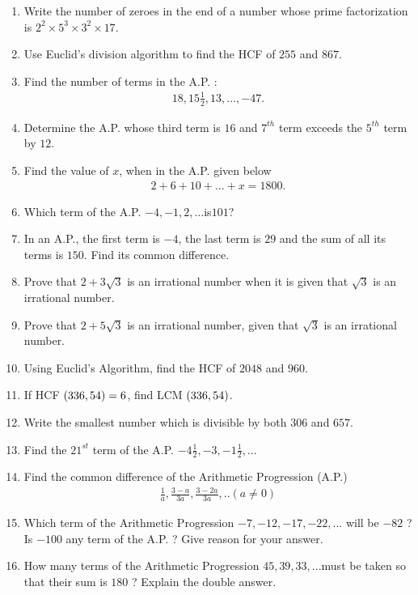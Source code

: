 \begin{enumerate}
\item Write the number of zeroes in the end of a number whose prime factorization is $2^2 \times 5^3 \times 3^2 \times 17$.

\item Use Euclid's division algorithm to find the HCF of $255$ and $867$.

\item Find the number of terms in the A.P. :
\begin{align*}
    18,15\frac{1}{2},13, ...,-47.
\end{align*}

\item Determine the A.P. whose third term is $16$ and $7^{th}$ term exceeds the $5^{th}$ term by $12$.

\item Find the value of $x$, when in the A.P. given below
\begin{align*}
2 + 6 + 10 + ... + x = 1800.    
\end{align*}

\item Which term of the A.P. $-4, - 1, 2, ... $is$ 101$?

\item In an A.P., the first term is $- 4$, the last term is $29$ and the sum of all its terms is $150$. Find its common difference.

\item Prove that $2 + 3\sqrt{3}$ is an irrational number when it is given that $\sqrt{3}$ is an irrational number.

\item Prove that $2+5\sqrt{3}$ is an irrational number, given that $\sqrt{3}$ is an irrational number.

\item Using Euclid's Algorithm, find the HCF of $2048$ and $960$.

\item If HCF $\left(336, 54\right) = 6$, find LCM $\left(336, 54\right)$.

\item Write the smallest number which is divisible by both $306$ and $657$.

\item Find the $21^{st}$ term of the A.P. $-4 \frac{1}{2},-3,-1\frac{1}{2},...$

\item Find the common difference of the Arithmetic Progression (A.P.) 
\begin{align*}
\frac{1}{a} , \frac{3-a}{3a},\frac{3-2a}{3a} , . . (a \neq 0)
\end{align*}

\item Which term of the Arithmetic Progression $-7, -12, -17, -22, ... $ will be $-82$ ? Is $-100$ any term of the A.P. ? Give reason for your answer.

\item How many terms of the Arithmetic Progression $45, 39, 33, ... $must be taken so that their sum is $180$ ? Explain the double answer.
\end{enumerate}
